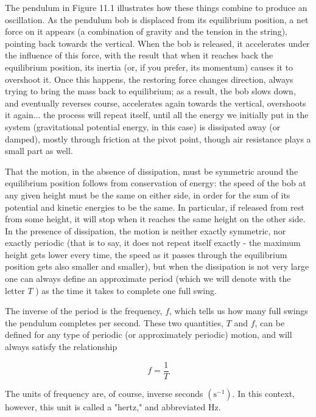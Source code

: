 \documentclass[10pt]{article}
\begin{document}
The pendulum in Figure 11.1 illustrates how these things combine to produce an oscillation. As the pendulum bob is displaced from its equilibrium position, a net force on it appears (a combination of gravity and the tension in the string), pointing back towards the vertical. When the bob is released, it accelerates under the influence of this force, with the result that when it reaches back the equilibrium position, its inertia (or, if you prefer, its momentum) causes it to overshoot it. Once this happens, the restoring force changes direction, always trying to bring the mass back to equilibrium; as a result, the bob slows down, and eventually reverses course, accelerates again towards the vertical, overshoots it again... the process will repeat itself, until all the energy we initially put in the system (gravitational potential energy, in this case) is dissipated away (or damped), mostly through friction at the pivot point, though air resistance plays a small part as well.

That the motion, in the absence of dissipation, must be symmetric around the equilibrium position follows from conservation of energy: the speed of the bob at any given height must be the same on either side, in order for the sum of its potential and kinetic energies to be the same. In particular, if released from rest from some height, it will stop when it reaches the same height on the other side. In the presence of dissipation, the motion is neither exactly symmetric, nor exactly periodic (that is to say, it does not repeat itself exactly - the maximum height gets lower every time, the speed as it passes through the equilibrium position gets also smaller and smaller), but when the dissipation is not very large one can always define an approximate period (which we will denote with the letter $T$ ) as the time it takes to complete one full swing.

The inverse of the period is the frequency, $f$, which tells us how many full swings the pendulum completes per second. These two quantities, $T$ and $f$, can be defined for any type of periodic (or approximately periodic) motion, and will always satisfy the relationship


\begin{equation*}
f=\frac{1}{T} \tag{11.1}
\end{equation*}


The units of frequency are, of course, inverse seconds $\left(\mathrm{s}^{-1}\right)$. In this context, however, this unit is called a "hertz," and abbreviated Hz.
\end{document}
